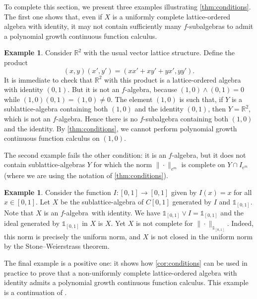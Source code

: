 \documentclass{amsart}
\theoremstyle{plain}
\theoremstyle{definition}
\newtheorem{example}[thm]{Example}
\theoremstyle{remark}
\newcommand\R{\ensuremath{\mathbb{R}}}
\newcommand{\one}{\mathbb{1}}
\newcommand{\falg}{$f\!$-algebra}
\begin{document}
To complete this section, we present three examples illustrating \cref{thm:conditions}.
The first one shows that, even if $X$ is a uniformly complete
lattice-ordered algebra with identity, it may not contain sufficiently many
$f\!$-subalgebras to admit a polynomial growth continuous function
calculus.

\begin{example}
    Consider $\R^2$ with the usual vector lattice structure. Define
    the product
    \[
        (x,y)(x',y')=(xx'+xy'+yx',yy').
    \]
    It is immediate to check that $\R^2$ with this product is a
    lattice-ordered algebra with identity $(0,1)$. But it is not an \falg,
    because $(1,0)\wedge (0,1)=0$ while $(1,0)(0,1)=(1,0)\neq 0$. The
    element $(1,0)$ is such that, if
    $Y$ is a sublattice-algebra containing both $(1,0)$ and the
    identity $(0,1)$, then
    $Y=\R^2$, which is not an \falg. Hence there is no $f$-subalgebra
    containing both $(1,0)$ and the identity. By
    \cref{thm:conditions}, we cannot perform
    polynomial growth continuous function calculus on $(1,0)$.
\end{example}

The second example fails the other condition: it is an \falg, but
it does not contain sublattice-algebras $Y$ for which the norm $\|{\cdot
}\|_{e^{m}}$ is complete on $Y\cap I_{e^{m}}$ (where we are using the notation of \cref{thm:conditions}).

\begin{example}
    Consider the function $I\colon [0,1]\to [0,1]$ given by $I(x)=x$
    for all $x \in [0,1]$. Let $X$ be the sublattice-algebra of
    $C[0,1]$ generated by $I$ and $\one_{[0,1]}$. Note that $X$ is an
    \falg\ with identity. We have $\one_{[0,1]}\vee I=\one_{[0,1]}$
    and the ideal generated by $\one_{[0,1]}$ in $X$ is $X$.
    Yet $X$ is not complete for $\|{\cdot }\|_{\one_{[0,1]}}$. Indeed,
    this norm is precisely the uniform norm, and $X$ is not closed
    in the uniform norm by the Stone--Weierstrass theorem.
\end{example}

The final example is a positive one: it shows how
\cref{cor:conditions} can be used in practice to prove that a
non-uniformly complete lattice-ordered algebra with identity admits a
polynomial growth continuous function calculus. This example is a
continuation of \cite[Proposition 3.1]{laustsen_troitsky2020}.
\end{document}
